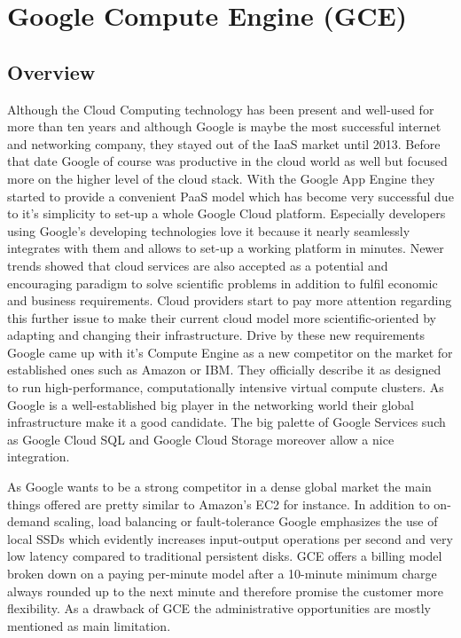 \section{Google Compute Engine (GCE)}

\subsection{Overview}
Although the Cloud Computing technology has been present and well-used for more than ten years and although Google is maybe the most successful internet and networking company, they stayed out of the IaaS market until 2013. Before that date Google of course was productive in the cloud world as well but focused more on the higher level of the cloud stack. With the Google App Engine they started to provide a convenient PaaS model which has become very successful due to it's simplicity to set-up a whole Google Cloud platform. Especially developers using Google's developing technologies love it because it nearly seamlessly integrates with them and allows to set-up a working platform in minutes. Newer trends showed that cloud services are also accepted as a potential and encouraging paradigm to solve scientific problems in addition to fulfil economic and business requirements. Cloud providers start to pay more attention regarding this further issue to make their current cloud model more scientific-oriented by adapting and changing their infrastructure. Drive by these new requirements Google came up with it's Compute Engine as a new competitor on the market for established ones such as Amazon or IBM. \cite{GCE_2013} They officially describe it as designed to run high-performance, computationally intensive virtual compute clusters. As Google is a well-established big player in the networking world their global infrastructure make it a good candidate. The big palette of Google Services such as Google Cloud SQL and Google Cloud Storage moreover allow a nice integration. \cite{IaaS_2015}

As Google wants to be a strong competitor in a dense global market the main things offered are pretty similar to Amazon's EC2 for instance. In addition to on-demand scaling, load balancing or fault-tolerance Google emphasizes the use of local SSDs which evidently increases input-output operations per second and very low latency compared to traditional persistent disks. GCE offers a billing model broken down on a paying per-minute model after a 10-minute minimum charge always rounded up to the next minute and therefore promise the customer more flexibility. As a drawback of GCE the administrative opportunities are mostly mentioned as main limitation. \cite{GoogleDev} 

